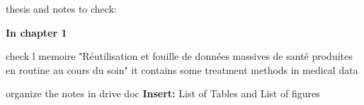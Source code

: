 
thesis and notes to check:



\textbf{In chapter 1}

check l memoire "Réutilisation et fouille de données massives de santé produites en routine au cours du soin" it contains some treatment methods in medical data 

\bigbreak
organize the notes in drive doc
\bigbreak
\textbf{Insert:} 
 List of Tables   and 	List of figures